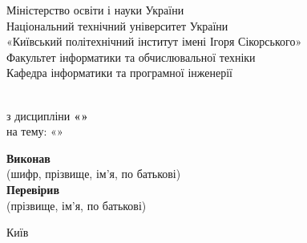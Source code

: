 \begin{titlepage}
    \begin{center}
        \Large
        Міністерство освіти і науки України \\
        Національний технічний університет України \\
        «Київський політехнічний інститут імені Ігоря Сікорського» \\
        [1\baselineskip]
        Факультет інформатики та обчислювальної техніки \\
        Кафедра інформатики та програмної інженерії \\
    \end{center}

    \vfill

    \begin{center}
        \Large
        \textbf{\TITLE} \\
        з дисципліни \textbf{«\DISCIPLINE»} \\
        на тему: «\SUBJECT»
    \end{center}

    \vfill

    \begin{center}
        \large
        \textbf{Виконав} \hfill \noindent \hrulefill \STUDENT \hrulefill \\
        \small (шифр, прізвище, ім'я, по батькові) \\
        [1\baselineskip]
        \large
        \textbf{Перевірив} \hfill \noindent \hrulefill \TEACHER \hrulefill \\
        \small (прізвище, ім'я, по батькові) \\
    \end{center}

    \vfill

    \begin{center}
        \Large
        Київ \the\year{}
    \end{center}
\end{titlepage}
